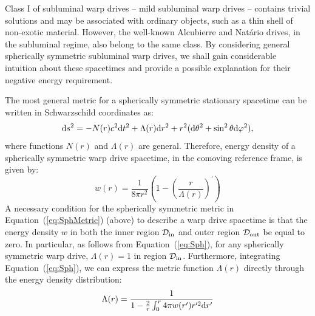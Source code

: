 \documentclass[10pt]{iopart}
\begin{document}
Class I of subluminal warp drives -- mild subluminal warp drives -- contains trivial solutions and may be associated with ordinary objects, such as a thin shell of non-exotic material. However, the well-known Alcubierre and Natário drives, in the subluminal regime, also belong to the same class. By considering general spherically symmetric subluminal warp drives, we shall gain considerable intuition about these spacetimes and provide a possible explanation for their negative energy requirement.


The most general metric for a spherically symmetric stationary spacetime can be written in Schwarzschild coordinates as:
\begin{equation}
    {\rm d}s^2 = - N(r) c^2{\rm d}t^2+\Lambda(r){\rm d}r^2+r^2({\rm d}\theta^2+\sin^2\theta{\rm d}\varphi^2),
\label{eq:SphMetric}
\end{equation}
where functions $N(r)$ and $\Lambda(r)$ are general. Therefore, energy density of a spherically symmetric warp drive spacetime, in the comoving reference frame, is given by:
\begin{equation}
    w(r)=\frac{1}{8\pi r^2}\left(1-(\frac{r}{\Lambda(r)})^\prime\right)
    \label{eq:Sph}
\end{equation}
A necessary condition for the spherically symmetric metric in Equation~(\ref{eq:SphMetric}) (above) to describe a warp drive spacetime is that the energy density $w$ in both the inner region $\mathcal{D}_{\rm in}$ and outer region $\mathcal{D}_{\rm out}$ be equal to zero. In particular, as follows from Equation~(\ref{eq:Sph}), for any spherically symmetric warp drive, $\Lambda(r)=1$ in region $\mathcal{D}_{\rm in}$. Furthermore, integrating Equation~(\ref{eq:Sph}), we can express the metric function $\Lambda(r)$ directly through the energy density distribution:
\begin{equation}
    \Lambda(r)=\frac{1}{1-\frac{2}{r}\int_0^r 4\pi w(r^\prime) r^{\prime 2}{\rm d}r^{\prime}}
\label{eq:Sph2}    
\end{equation}
\end{document}
